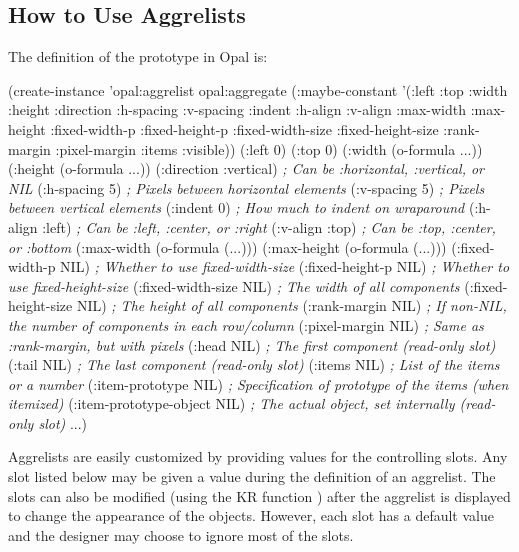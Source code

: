 \begin{group}
\subsection{How to Use Aggrelists}

\vspace{1 line}
The definition of the  prototype in Opal is:
\vspace{1 line}

\begin{programexample}
(create-instance 'opal:aggrelist opal:aggregate
 (:maybe-constant '(:left :top :width :height :direction :h-spacing :v-spacing
		    :indent :h-align :v-align :max-width :max-height
		    :fixed-width-p :fixed-height-p :fixed-width-size
		    :fixed-height-size :rank-margin :pixel-margin :items :visible))
 (:left 0)
 (:top 0)
 (:width (o-formula ...))
 (:height (o-formula ...))
 (:direction :vertical)	      {\it ; Can be :horizontal, :vertical, or NIL}
 (:h-spacing 5)		      {\it ; Pixels between horizontal elements}
 (:v-spacing 5)		      {\it ; Pixels between vertical elements}
 (:indent 0)		      {\it ; How much to indent on wraparound}
 (:h-align :left)	      {\it ; Can be :left, :center, or :right}
 (:v-align :top)	      {\it ; Can be :top, :center, or :bottom}
 (:max-width  (o-formula (...)))
 (:max-height (o-formula (...)))
 (:fixed-width-p NIL)	      {\it ; Whether to use fixed-width-size}
 (:fixed-height-p NIL)        {\it ; Whether to use fixed-height-size}
 (:fixed-width-size NIL)      {\it ; The width of all components}
 (:fixed-height-size NIL)     {\it ; The height of all components}
 (:rank-margin NIL)           {\it ; If non-NIL, the number of components in each row/column}
 (:pixel-margin NIL)          {\it ; Same as :rank-margin, but with pixels}
 (:head NIL)                  {\it ; The first component (read-only slot)}
 (:tail NIL)                  {\it ; The last component (read-only slot)}
 (:items NIL)                 {\it ; List of the items or a number}
 (:item-prototype NIL)        {\it ; Specification of prototype of the items (when itemized)}
 (:item-prototype-object NIL) {\it ; The actual object, set internally (read-only slot)}
 ...)
\end{programexample}
\end{group}

Aggrelists are easily customized by providing values for the controlling
slots.  Any slot listed below may be given a value during the definition
of an aggrelist.  The slots can also be modified (using the KR function
) after the aggrelist is displayed to change the appearance of
the objects.  However, each slot has a default value and the designer
may choose to ignore most of the slots.

